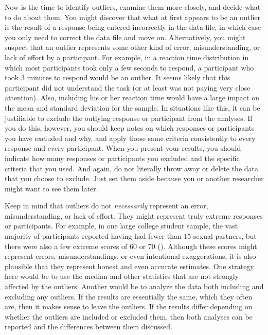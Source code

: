 \documentclass[
]{krantz}
\begin{document}
Now is the time to identify outliers, examine them more closely, and decide what to do about them. You might discover that what at first appears to be an outlier is the result of a response being entered incorrectly in the data file, in which case you only need to correct the data file and move on. Alternatively, you might suspect that an outlier represents some other kind of error, misunderstanding, or lack of effort by a participant. For example, in a reaction time distribution in which most participants took only a few seconds to respond, a participant who took 3 minutes to respond would be an outlier. It seems likely that this participant did not understand the task (or at least was not paying very close attention). Also, including his or her reaction time would have a large impact on the mean and standard deviation for the sample. In situations like this, it can be justifiable to exclude the outlying response or participant from the analyses. If you do this, however, you should keep notes on which responses or participants you have excluded and why, and apply those same criteria consistently to every response and every participant. When you present your results, you should indicate how many responses or participants you excluded and the specific criteria that you used. And again, do not literally throw away or delete the data that you choose to exclude. Just set them aside because you or another researcher might want to see them later.

Keep in mind that outliers do not \emph{necessarily} represent an error, misunderstanding, or lack of effort. They might represent truly extreme responses or participants. For example, in one large college student sample, the vast majority of participants reported having had fewer than 15 sexual partners, but there were also a few extreme scores of 60 or 70 (). Although these scores might represent errors, misunderstandings, or even intentional exaggerations, it is also plausible that they represent honest and even accurate estimates. One strategy here would be to use the median and other statistics that are not strongly affected by the outliers. Another would be to analyze the data both including and excluding any outliers. If the results are essentially the same, which they often are, then it makes sense to leave the outliers. If the results differ depending on whether the outliers are included or excluded them, then both analyses can be reported and the differences between them discussed.
\end{document}
